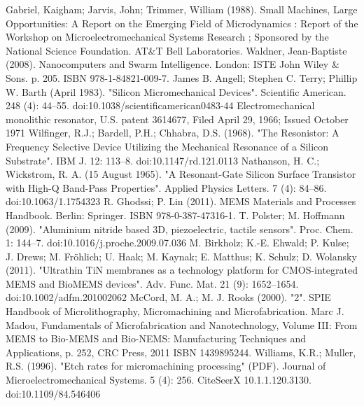 \documentclass[no-math]{YangThesis}
\begin{document}
\newpage
\begin{thebibliography}{9}

  Gabriel, Kaigham; Jarvis, John; Trimmer, William (1988). Small Machines, Large Opportunities: A Report on the Emerging Field of Microdynamics : Report of the Workshop on Microelectromechanical Systems Research ; Sponsored by the National Science Foundation. AT\&T Bell Laboratories.
  Waldner, Jean-Baptiste (2008). Nanocomputers and Swarm Intelligence. London: ISTE John Wiley \& Sons. p. 205. ISBN 978-1-84821-009-7.
  James B. Angell; Stephen C. Terry; Phillip W. Barth (April 1983). "Silicon Micromechanical Devices". Scientific American. 248 (4): 44–55. doi:10.1038/scientificamerican0483-44
  Electromechanical monolithic resonator, U.S. patent 3614677, Filed April 29, 1966; Issued October 1971
  Wilfinger, R.J.; Bardell, P.H.; Chhabra, D.S. (1968). "The Resonistor: A Frequency Selective Device Utilizing the Mechanical Resonance of a Silicon Substrate". IBM J. 12: 113–8. doi:10.1147/rd.121.0113
  Nathanson, H. C.; Wickstrom, R. A. (15 August 1965). "A Resonant-Gate Silicon Surface Transistor with High-Q Band-Pass Properties". Applied Physics Letters. 7 (4): 84–86. doi:10.1063/1.1754323
  R. Ghodssi; P. Lin (2011). MEMS Materials and Processes Handbook. Berlin: Springer. ISBN 978-0-387-47316-1.
  T. Polster; M. Hoffmann (2009). "Aluminium nitride based 3D, piezoelectric, tactile sensors". Proc. Chem. 1: 144–7. doi:10.1016/j.proche.2009.07.036
  M. Birkholz; K.-E. Ehwald; P. Kulse; J. Drews; M. Fröhlich; U. Haak; M. Kaynak; E. Matthus; K. Schulz; D. Wolansky (2011). "Ultrathin TiN membranes as a technology platform for CMOS-integrated MEMS and BioMEMS devices". Adv. Func. Mat. 21 (9): 1652–1654. doi:10.1002/adfm.201002062
  McCord, M. A.; M. J. Rooks (2000). "2". SPIE Handbook of Microlithography, Micromachining and Microfabrication.
  Marc J. Madou, Fundamentals of Microfabrication and Nanotechnology, Volume III: From MEMS to Bio-MEMS and Bio-NEMS: Manufacturing Techniques and Applications, p. 252, CRC Press, 2011 ISBN 1439895244.
  Williams, K.R.; Muller, R.S. (1996). "Etch rates for micromachining processing" (PDF). Journal of Microelectromechanical Systems. 5 (4): 256. CiteSeerX 10.1.1.120.3130. doi:10.1109/84.546406

\end{thebibliography}
\end{document}
